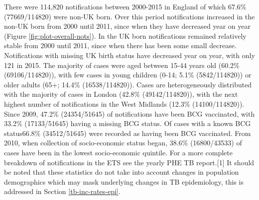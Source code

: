\documentclass[11pt,twoside]{bristolthesis}
\begin{document}
  There were 114,820 notifications between 2000-2015 in England of which 67.6\% (77669/114820) were non-UK born. Over this period notifications increased in the non-UK born from 2000 until 2011, since when they have decreased year on year (Figure \ref{fig:plot-overall-nots}). In the UK born notifications remained relatively stable from 2000 until 2011, since when there has been some small decrease. Notifications with missing UK birth status have decreased year on year, with only 121 in 2015. The majority of cases were aged between 15-44 years old (60.2\% (69106/114820)), with few cases in young children (0-14; 5.1\% (5842/114820)) or older adults (65+; 14.4\% (16538/114820)). Cases are heterogeneously distributed with the majority of cases in London (42.8\% (49142/114820)), with the next highest number of notifications in the West Midlands (12.3\% (14100/114820)). Since 2009, 47.2\% (24354/51645) of notifications have been BCG vaccinated, with 33.2\% (17133/51645) having a missing BCG status. Of cases with a known BCG status66.8\% (34512/51645) were recorded as having been BCG vaccinated. From 2010, when collection of socio-economic status began, 38.6\% (16800/43533) of cases have been in the lowest socio-economic quintile. For a more complete breakdown of notifications in the ETS see the yearly PHE TB report.{[}1{]} It should be noted that these statistics do not take into account changes in population demographics which may mask underlying changes in TB epidemiology, this is addressed in Section \ref{tb-inc-rates-epi}.
\end{document}
